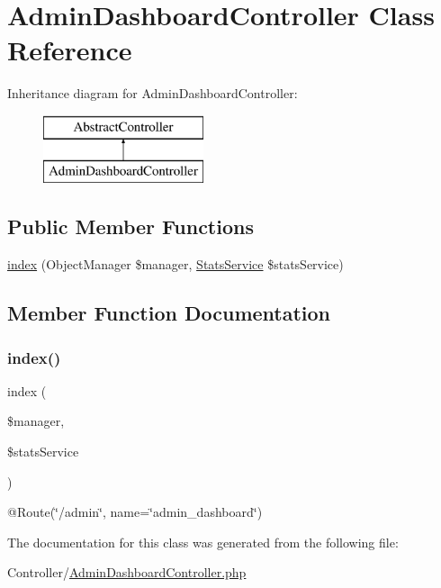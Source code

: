 \hypertarget{class_app_1_1_controller_1_1_admin_dashboard_controller}{}\section{Admin\+Dashboard\+Controller Class Reference}
\label{class_app_1_1_controller_1_1_admin_dashboard_controller}
Inheritance diagram for Admin\+Dashboard\+Controller\+:\begin{figure}[H]
\begin{center}
\leavevmode
\includegraphics[height=2.000000cm]{class_app_1_1_controller_1_1_admin_dashboard_controller}
\end{center}
\end{figure}
\subsection*{Public Member Functions}
\begin{DoxyCompactItemize}
\item 
\mbox{\hyperlink{class_app_1_1_controller_1_1_admin_dashboard_controller_a291f6880c3d758ce3003474f30dcf1fa}{index}} (Object\+Manager \$manager, \mbox{\hyperlink{class_app_1_1_service_1_1_stats_service}{Stats\+Service}} \$stats\+Service)
\end{DoxyCompactItemize}


\subsection{Member Function Documentation}
\mbox{\label{class_app_1_1_controller_1_1_admin_dashboard_controller_a291f6880c3d758ce3003474f30dcf1fa}} 
\subsubsection{\texorpdfstring{index()}{index()}}
{\footnotesize\ttfamily index (\begin{DoxyParamCaption}\item[{Object\+Manager}]{\$manager,  }\item[{\mbox{\hyperlink{class_app_1_1_service_1_1_stats_service}{Stats\+Service}}}]{\$stats\+Service }\end{DoxyParamCaption})}

@\+Route(\char`\"{}/admin\char`\"{}, name=\char`\"{}admin\+\_\+dashboard\char`\"{}) 

The documentation for this class was generated from the following file\+:\begin{DoxyCompactItemize}
\item 
Controller/\mbox{\hyperlink{_admin_dashboard_controller_8php}{Admin\+Dashboard\+Controller.\+php}}\end{DoxyCompactItemize}
